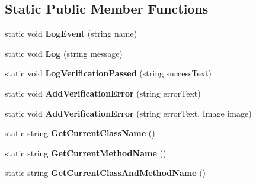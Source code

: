 \subsection*{Static Public Member Functions}
\begin{DoxyCompactItemize}
\item 
\hypertarget{class_proto_test_1_1_golem_1_1_core_1_1_test_base_a06a3960a0faa2c1a231b7a23f4d461b1}{static void {\bfseries Log\-Event} (string name)}\label{class_proto_test_1_1_golem_1_1_core_1_1_test_base_a06a3960a0faa2c1a231b7a23f4d461b1}

\item 
\hypertarget{class_proto_test_1_1_golem_1_1_core_1_1_test_base_ad2a6e3bd9a8a1b3aefab8fd0df5dba66}{static void {\bfseries Log} (string message)}\label{class_proto_test_1_1_golem_1_1_core_1_1_test_base_ad2a6e3bd9a8a1b3aefab8fd0df5dba66}

\item 
\hypertarget{class_proto_test_1_1_golem_1_1_core_1_1_test_base_a7b55ad65263ca6ba2831b4ffc942b786}{static void {\bfseries Log\-Verification\-Passed} (string success\-Text)}\label{class_proto_test_1_1_golem_1_1_core_1_1_test_base_a7b55ad65263ca6ba2831b4ffc942b786}

\item 
\hypertarget{class_proto_test_1_1_golem_1_1_core_1_1_test_base_a9a3d759ab6fc793532198d3f19d42299}{static void {\bfseries Add\-Verification\-Error} (string error\-Text)}\label{class_proto_test_1_1_golem_1_1_core_1_1_test_base_a9a3d759ab6fc793532198d3f19d42299}

\item 
\hypertarget{class_proto_test_1_1_golem_1_1_core_1_1_test_base_a8611cc0dbf75928588f490de52a9bf24}{static void {\bfseries Add\-Verification\-Error} (string error\-Text, Image image)}\label{class_proto_test_1_1_golem_1_1_core_1_1_test_base_a8611cc0dbf75928588f490de52a9bf24}

\item 
\hypertarget{class_proto_test_1_1_golem_1_1_core_1_1_test_base_a9dd8d235766e65c190940d151cf46792}{static string {\bfseries Get\-Current\-Class\-Name} ()}\label{class_proto_test_1_1_golem_1_1_core_1_1_test_base_a9dd8d235766e65c190940d151cf46792}

\item 
\hypertarget{class_proto_test_1_1_golem_1_1_core_1_1_test_base_af2c4c697dc4afd0e7a392a981135ebfd}{static string {\bfseries Get\-Current\-Method\-Name} ()}\label{class_proto_test_1_1_golem_1_1_core_1_1_test_base_af2c4c697dc4afd0e7a392a981135ebfd}

\item 
\hypertarget{class_proto_test_1_1_golem_1_1_core_1_1_test_base_ac33ed67f671f1a8cd1a909992c8e7ac6}{static string {\bfseries Get\-Current\-Class\-And\-Method\-Name} ()}\label{class_proto_test_1_1_golem_1_1_core_1_1_test_base_ac33ed67f671f1a8cd1a909992c8e7ac6}

\end{DoxyCompactItemize}
